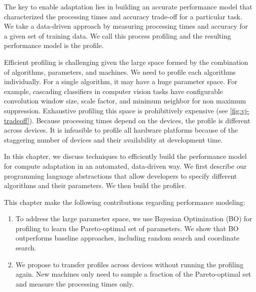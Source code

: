 The key to enable adaptation lies in building an accurate performance model that
characterized the processing times and accuracy trade-off for a particular
task. We take a data-driven approach by measuring processing times and accuracy
for a given set of training data. We call this process profiling and the
resulting performance model is the profile.

Efficient profiling is challenging given the large space formed by the
combination of algorithms, parameters, and machines. We need to profile each
algorithms individually. For a single algorithm, it may have a huge parameter
space. For example, cascading classifiers in computer vision tasks have
configurable convolution window size, scale factor, and minimum neighbor for non
maximum suppression. Exhaustive profiling this space is prohibitively expensive
(see \autoref{fig:vj-tradeoff}). Because processing times depend on the devices,
the profile is different across devices. It is infeasible to profile all
hardware platforms because of the staggering number of devices and their
availability at development time.

In this chapter, we discuss techniques to efficiently build the performance
model for compute adaptation in an automated, data-driven way. We first describe
our programming language abstractions that allow developers to specify different
algorithms and their parameters. We then build the profiler. 

This chapter make the following contributions regarding performance modeling:

\begin{enumerate}[noitemsep, topsep=0pt]
\item To address the large parameter space, we use Bayesian Optimization (BO)
  for profiling to learn the Pareto-optimal set of parameters. We show that BO
  outperforms baseline approaches, including random search and coordinate
  search.
\item We propose to transfer profiles across devices without running the
  profiling again. New machines only need to sample a fraction of the
  Pareto-optimal set and measure the processing times only.
\end{enumerate}

